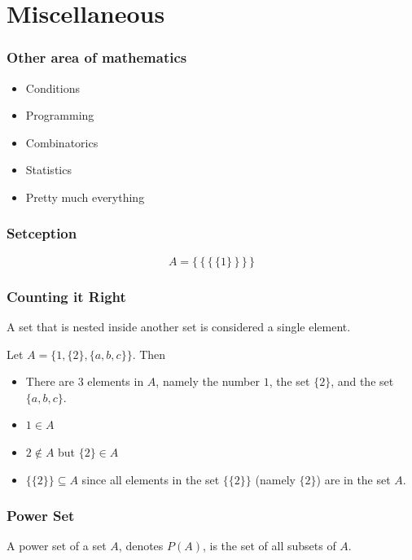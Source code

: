 \section{Miscellaneous}
\frame{\sectionpage}

\begin{frame}
\frametitle{Other area of mathematics}
\begin{itemize}
\item Conditions 
\item Programming 
\item Combinatorics 
\item Statistics 
\item Pretty much everything
\end{itemize}
\end{frame}

\begin{frame}
\frametitle{Setception}
\[A = \{ \, \{ \, \{ \, \{ 1 \} \, \} \, \} \, \}\]
\end{frame}

\begin{frame}
\frametitle{Counting it Right}
A set that is nested inside another set is considered a single element. 
\begin{block}{}
Let $A = \{1, \{2\}, \{a,b,c\}\}$. Then
\begin{itemize}
\item There are 3 elements in $A$, namely the number $1$, the set $\{2\}$, and the set $\{a,b,c\}$.
\item $1 \in A$
\item $2 \not\in A$ but $\{2\} \in A$
\item $\{\{2\}\} \subseteq A$ since all elements in the set $\{\{2\}\}$ (namely $\{2\}$) are in the set $A$.
\end{itemize}
\end{block}
\end{frame}

\begin{frame}
\frametitle{Power Set}
\begin{defn}{}{}
A power set of a set $A$, denotes $P(A)$, is the set of all subsets of $A$.
\end{defn}
\end{frame}

\newcommand{\bt}{\bigtriangleup}
\newcommand{\bc}{\bigcirc}

